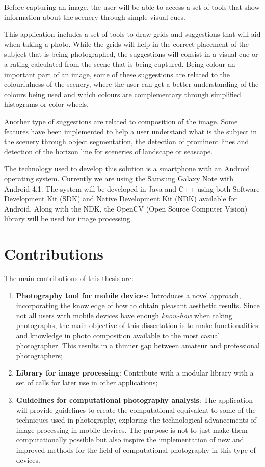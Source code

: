 Before capturing an image, the user will be able to access a set of tools that show information about the scenery through simple visual cues.

This application includes a set of tools to draw grids and suggestions that will aid when taking a photo. While the grids will help in the correct placement of the subject that is being photographed, the suggestions will consist in a visual cue or a rating calculated from the scene that is being captured.
Being colour an important part of an image, some of these suggestions are related to the colourfulness of the scenery, where the user can get a better understanding of the colours being used and which colours are complementary through simplified histograms or color wheels.

Another type of suggestions are related to composition of the image. Some features have been implemented to help a user understand what is the subject in the scenery through object segmentation, the detection of prominent lines and detection of the horizon line for sceneries of landscape or seascape.

The technology used to develop this solution is a smartphone with an Android operating system. Currently we are using the Samsung Galaxy Note with Android 4.1. The system will be developed in Java and C++ using both Software Development Kit (SDK) \cite{SDK} and Native Development Kit (NDK) \cite{NDK} available for Android.  Along with the NDK, the OpenCV (Open Source Computer Vision) \cite{OCV} library will be used for image processing.

\section{Contributions}
\label{sec:contributions}

The main contributions of this thesis are:
\begin{enumerate}
	\item \textbf{Photography tool for mobile devices}: Introduces a novel approach, incorporating the knowledge of how to obtain pleasant aesthetic results. Since not all users with mobile devices have enough \emph{know-how} when taking photographs, the main objective of this dissertation is to make functionalities and knowledge in photo composition available to the most casual photographer. This results in a thinner gap between amateur and professional photographers;

	\item \textbf{Library for image processing}: Contribute with a modular library with a set of calls for later use in other applications;
	
	\item \textbf{Guidelines for computational photography analysis}: The application will provide guidelines to create the computational equivalent to some of the techniques used in photography, exploring the technological advancements of image processing in mobile devices. The purpose is not to just make them computationally possible but also inspire the implementation of new and improved methods for the field of computational photography in this type of devices.
	
\end{enumerate}

